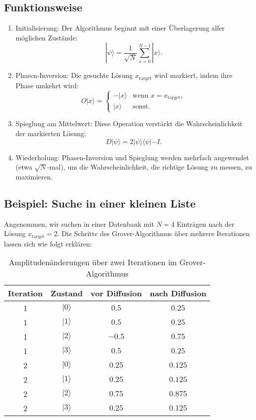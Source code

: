 \subsection{Funktionsweise}
\begin{enumerate}
    \item Initialisierung: Der Algorithmus beginnt mit einer Überlagerung aller möglichen Zustände:
        \[
        |\psi\rangle = \frac{1}{\sqrt{N}} \sum_{x=0}^{N-1} |x\rangle.
        \]

    \item Phasen-Inversion: Die gesuchte Lösung $x_{\text{target}}$ wird markiert, indem ihre Phase umkehrt wird:
        \[
        O |x\rangle = \begin{cases} 
            -|x\rangle & \text{wenn } x = x_{\text{target}}, \\
            |x\rangle & \text{sonst}.
        \end{cases}
        \]

    \item Spieglung am Mittelwert: Diese Operation verstärkt die Wahrscheinlichkeit der markierten Lösung:
        \[
        D |\psi\rangle = 2|\psi\rangle\langle\psi| - I.
        \]

    \item Wiederholung: Phasen-Inversion und Spieglung werden mehrfach angewendet (etwa $\sqrt{N}$-mal), um die 
    Wahrscheinlichkeit, die richtige Lösung zu messen, zu maximieren.
\end{enumerate}

\subsection{Beispiel: Suche in einer kleinen Liste}
Angenommen, wir suchen in einer Datenbank mit $N=4$ Einträgen nach der Lösung $x_{\text{target}}=2$. Die Schritte des 
Grover-Algorithmus über mehrere Iterationen lassen sich wie folgt erklären:

\begin{table}[H]
    \centering
    \begin{tabular}{|c|c|c|c|}
        \hline
        Iteration & Zustand & vor Diffusion & nach Diffusion \\
        \hline
        1 & $|0\rangle$ & $0.5$ & $0.25$ \\
        1 & $|1\rangle$ & $0.5$ & $0.25$ \\
        1 & $|2\rangle$ & $-0.5$ & $0.75$ \\
        1 & $|3\rangle$ & $0.5$ & $0.25$ \\
        \hline
        2 & $|0\rangle$ & $0.25$ & $0.125$ \\
        2 & $|1\rangle$ & $0.25$ & $0.125$ \\
        2 & $|2\rangle$ & $0.75$ & $0.875$ \\
        2 & $|3\rangle$ & $0.25$ & $0.125$ \\
        \hline
    \end{tabular}
    \caption{Amplitudenänderungen über zwei Iterationen im Grover-Algorithmus}
\end{table}

